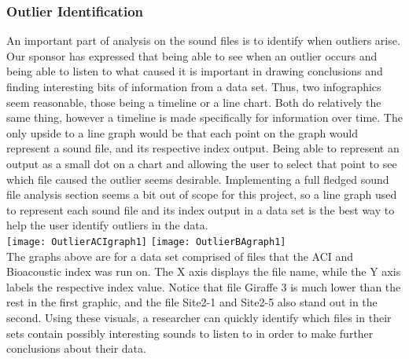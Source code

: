 \subsubsection{Outlier Identification}
An important part of analysis on the sound files is to identify when outliers arise. Our sponsor has expressed that being able to see when an outlier occurs and being able to listen to what caused it is important in drawing conclusions and finding interesting bits of information from a data set. Thus, two infographics seem reasonable, those being a timeline or a line chart. Both do relatively the same thing, however a timeline is made specifically for information over time. The only upside to a line graph would be that each point on the graph would represent a sound file, and its respective index output. Being able to represent an output as a small dot on a chart and allowing the user to select that point to see which file caused the outlier seems desirable. Implementing a full fledged sound file analysis section seems a bit out of scope for this project, so a line graph used to represent each sound file and its index output in a data set is the best way to help the user identify outliers in the data.\\

\texttt{[image: OutlierACIgraph1]}
\texttt{[image: OutlierBAgraph1]}\\
The graphs above are for a data set comprised of files that the ACI and Bioacoustic index was run on. The X axis displays the file name, while the Y axis labels the respective index value. Notice that file Giraffe 3 is much lower than the rest in the first graphic, and the file Site2-1 and Site2-5 also stand out in the second. Using these visuals, a researcher can quickly identify which files in their sets contain possibly interesting sounds to listen to in order to make further conclusions about their data.
